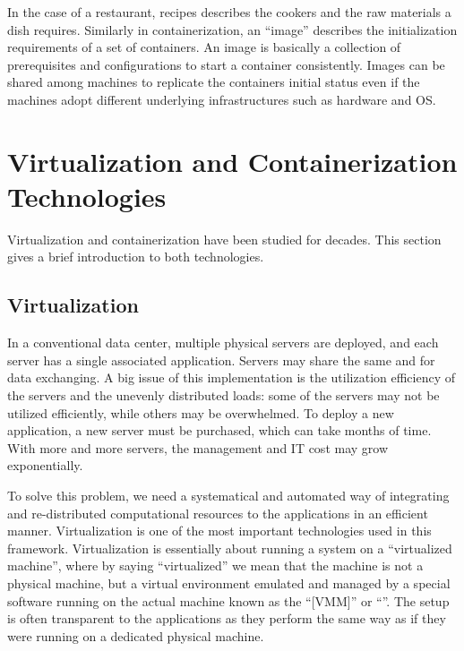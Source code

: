 In the case of a restaurant, recipes describes the cookers and the raw materials a dish requires. Similarly in containerization, an ``image'' describes the initialization requirements of a set of containers. An image is basically a collection of prerequisites and configurations to start a container consistently. Images can be shared among machines to replicate the containers initial status even if the machines adopt different underlying infrastructures such as hardware and OS.

\section{Virtualization and Containerization Technologies}

Virtualization and containerization have been studied for decades. This section gives a brief introduction to both technologies.

\subsection{Virtualization}

In a conventional data center, multiple physical servers are deployed, and each server has a single associated application. Servers may share the same  and  for data exchanging. A big issue of this implementation is the utilization efficiency of the servers and the unevenly distributed loads: some of the servers may not be utilized efficiently, while others may be overwhelmed. To deploy a new application, a new server must be purchased, which can take months of time. With more and more servers, the management and IT cost may grow exponentially.

To solve this problem, we need a systematical and automated way of integrating and re-distributed computational resources to the applications in an efficient manner. Virtualization is one of the most important technologies used in this framework. Virtualization is essentially about running a system on a ``virtualized machine'', where by saying ``virtualized'' we mean that the machine is not a physical machine, but a virtual environment emulated and managed by a special software running on the actual machine known as the ``[VMM]'' or ``''. The setup is often transparent to the applications as they perform the same way as if they were running on a dedicated physical machine.


